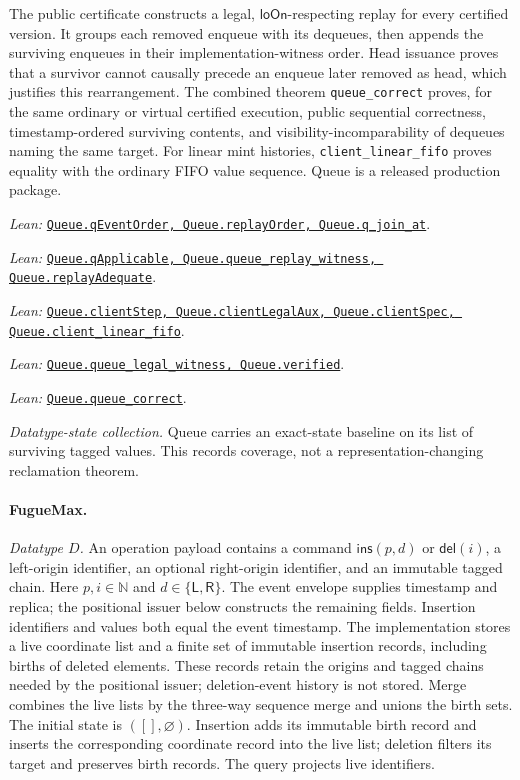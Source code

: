 \documentclass[11pt]{article}
\theoremstyle{definition}
\newcommand{\N}{\mathbb N}
\newcommand{\lean}[1]{\texttt{#1}}
\newcommand{\src}[2]{\href{../../#1}{\texttt{#2}}}
\newcommand{\anchor}[2]{\par\smallskip\noindent\emph{Lean: }\src{#1}{#2}.}
\begin{document}
The public certificate constructs a legal, $\mathsf{loOn}$-respecting replay
for every certified version. It groups each removed enqueue with its dequeues,
then appends the surviving enqueues in their implementation-witness order.
Head issuance proves that a survivor cannot causally precede an enqueue later
removed as head, which justifies this rearrangement. The combined theorem
\lean{queue\_correct} proves, for the same ordinary or virtual certified
execution, public sequential correctness, timestamp-ordered surviving contents,
and visibility-incomparability of dequeues naming the same target.
For linear mint histories, \lean{client\_linear\_fifo} proves equality with the
ordinary FIFO value sequence. Queue is a released production package.
\anchor{Sal/MRDTs/Instances/Queue.lean}
  {Queue.qEventOrder, Queue.replayOrder, Queue.q\_join\_at}
\anchor{Sal/MRDTs/Instances/QueueCertificates.lean}
  {Queue.qApplicable, Queue.queue\_replay\_witness, Queue.replayAdequate}
\anchor{Sal/MRDTs/Instances/QueueContract.lean}
  {Queue.clientStep, Queue.clientLegalAux, Queue.clientSpec, Queue.client\_linear\_fifo}
\anchor{Sal/MRDTs/Instances/QueueLegalization.lean}
  {Queue.queue\_legal\_witness, Queue.verified}
\anchor{Sal/MRDTs/Instances/QueueCorrectness.lean}
  {Queue.queue\_correct}

\emph{Datatype-state collection.} Queue carries an exact-state baseline on its list of surviving tagged values.
This records coverage, not a representation-changing reclamation theorem.

\paragraph{FugueMax.}

\emph{Datatype $D$.} An operation payload contains a command $\mathsf{ins}(p,d)$ or
$\mathsf{del}(i)$, a left-origin identifier, an optional right-origin
identifier, and an immutable tagged chain. Here $p,i\in\N$ and
$d\in\{\mathsf{L},\mathsf{R}\}$. The event envelope supplies timestamp and
replica; the positional issuer below constructs the remaining fields.
Insertion identifiers and values both equal the event timestamp.
The implementation stores a live coordinate list and a finite set of immutable
insertion records, including births of deleted elements. These records retain
the origins and tagged chains needed by the positional issuer; deletion-event
history is not stored. Merge combines the live lists by the three-way sequence
merge and unions the birth sets. The initial state is $([],\varnothing)$.
Insertion adds its immutable birth record and inserts the corresponding
coordinate record into the live list; deletion filters its target and preserves
birth records. The query projects live identifiers.
\end{document}
